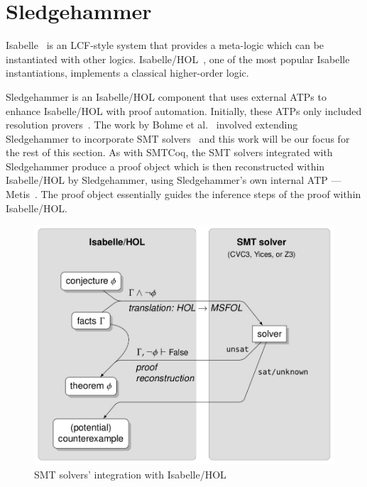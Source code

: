 \documentclass[11pt]{article}
\begin{document}
	
	\section{Sledgehammer}
	\label{sec:hammer}
	Isabelle~\cite{DBLP:journals/corr/cs-LO-9301106} 
	is an LCF-style system that 
	provides a meta-logic which can be 
	instantiated with other logics.
	Isabelle/HOL~\cite{10.5555/1791547}, 
	one of the most popular Isabelle 
	instantiations, implements a 
	classical higher-order logic. 
	
	Sledgehammer is
	an Isabelle/HOL component that 
	uses external ATPs to enhance 
	Isabelle/HOL with proof 
	automation. Initially, these 
	ATPs only included resolution 
	provers~\cite{10.1007/978-3-642-39799-8_1}.
	The work by Bohme et 
	al.~\cite{bohme} involved 
	extending Sledgehammer to 
	incorporate SMT
	solvers~\cite{Barrett2018} and this 
	work will be our focus for the 
	rest of this section. As with 
	SMTCoq, the SMT solvers integrated
	with Sledgehammer produce a 
	proof object which is 
	then reconstructed within
	Isabelle/HOL by Sledgehammer, 
	using Sledgehammer's own internal 
	ATP --- Metis~\cite{hurd2003d}. The 
	proof object essentially guides 
	the inference steps of the proof 
	within Isabelle/HOL.
	
	\begin{figure}[t]
		\begin{center}
			\includegraphics[scale=0.3]{sledgehammer}
			\caption{SMT solvers' integration with 
			Isabelle/HOL}
			\label{fig:sledgehammer}
		\end{center}
	\end{figure}
\end{document}
